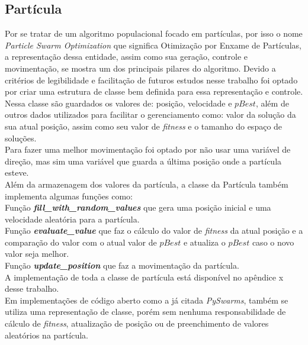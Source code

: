 \subsection{Partícula}
Por se tratar de um algoritmo populacional focado em partículas, por isso o nome \textit{Particle Swarm Optimization} que significa Otimização por Enxame de Partículas, a representação dessa entidade, assim como sua geração, controle e movimentação, se mostra um dos principais pilares do algoritmo. Devido a critérios de legibilidade e facilitação de futuros estudos nesse trabalho foi optado por criar uma estrutura de classe bem definida para essa representação e controle.
Nessa classe são guardados os valores de: posição, velocidade e $pBest$, além de outros dados utilizados para facilitar o gerenciamento como: valor da solução da sua atual posição, assim como seu valor de \textit{fitness} e o tamanho do espaço de soluções.\\
\indent Para fazer uma melhor movimentação foi optado por não usar uma variável de direção, mas sim uma variável que guarda a última posição onde a partícula esteve.\\
Além da armazenagem dos valores da partícula, a classe da Partícula também implementa algumas funções como:\\
Função \textbf{\textit{fill\_with\_random\_values}} que gera uma posição inicial e uma velocidade aleatória para a partícula.\\
Função \textbf{\textit{evaluate\_value}} que faz o cálculo do valor de \textit{fitness} da atual posição e a comparação do valor com o atual valor de $pBest$ e atualiza o $pBest$ caso o novo valor seja melhor.\\
Função \textbf{\textit{update\_position}} que faz a movimentação da partícula.\\
\noindent A implementação de toda a classe de partícula está disponível no apêndice x desse trabalho.\\
\indent Em implementações de código aberto como a já citada \textit{PySwarms}, também se utiliza uma representação de classe, porém sem nenhuma responsabilidade de cálculo de \textit{fitness}, atualização de posição ou de preenchimento de valores aleatórios na partícula.\\
